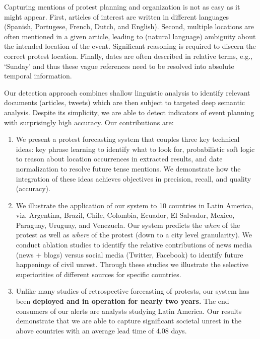 Capturing mentions of protest planning and organization 
is not as easy as it might appear. First, articles of interest are written in
different languages (Spanish, Portugese, French, Dutch, and English). 
Second, multiple locations are often mentioned in a given article, leading
to (natural language) ambiguity about the intended location of the event.
Significant reasoning is required to discern the correct protest location.
Finally, dates are often described in relative terms, e.g., `Sunday' and 
thus these vague references need to be resolved into absolute temporal
information. 

Our detection approach combines shallow linguistic analysis to identify relevant
documents (articles, tweets) which are then subject to targeted deep semantic analysis.
Despite its simplicity, we are able to detect indicators of event planning with surprisingly high
accuracy. Our contributions are:

\iffalse
\begin{figure}
    \texttt{[image: alertstructure]}
    \vspace{-2em}
    \caption{An example warning (left) and GSR event (right).}
    \label{fig:alertstructure}
\end{figure}
\fi

\begin{enumerate}
\item We present a protest forecasting system that couples three key technical ideas:
key phrase learning to identify what to look for, probabilistic soft logic to reason about location occurrences in extracted results, and 
date normalization to resolve future tense mentions. We demonstrate how the integration of these ideas achieves objectives in precision,
recall, and quality (accuracy).
\item We illustrate the application of our system to 10 countries in Latin America, viz. Argentina, Brazil, Chile, Colombia, Ecuador, El Salvador, Mexico, Paraguay, Uruguay, and Venezuela. Our system predicts the {\it when} of the protest
as well as {\it where} of the protest (down to a city level granularity).
We conduct ablation studies to identify the 
relative contributions of news media (news + blogs) versus social media (Twitter, Facebook) to identify future happenings of
civil unrest. Through these studies we illustrate the selective superiorities of different sources for specific countries.
\item Unlike many studies of retrospective forecasting of protests,
our system has been {\bf deployed and in operation for nearly two years.}
The end consumers of our alerts are analysts studying Latin America.
Our results demonstrate that we are able to 
capture significant societal unrest in the above countries with an average lead time of 4.08 days. 

\end{enumerate}

